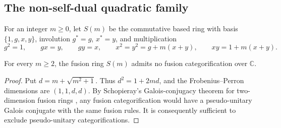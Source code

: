 \subsection{The non-self-dual quadratic family}

For an integer $m\geq0$, let $S(m)$ be the commutative based ring with basis
$\{1,g,x,y\}$, involution $g^*=g$, $x^*=y$, and multiplication
\[
 g^2=1,\qquad gx=y,\qquad gy=x,\qquad
 x^2=y^2=g+m(x+y),\qquad xy=1+m(x+y).
\]

\begin{theorem}\label{thm:nonselfdual-quadratic}
For every $m\geq2$, the fusion ring $S(m)$ admits no fusion categorification
over $\mathbb C$.
\end{theorem}

\begin{proof}
Put $d=m+\sqrt{m^2+1}$. Thus $d^2=1+2md$, and the Frobenius--Perron
dimensions are $(1,1,d,d)$. By Schopieray's Galois-conjugacy theorem for
two-dimension fusion rings \cite[Lemma~3.1]{Schopieray}, any fusion
categorification would have a pseudo-unitary Galois conjugate with the same
fusion rules. It is consequently sufficient to exclude pseudo-unitary
categorifications.


\end{proof}
